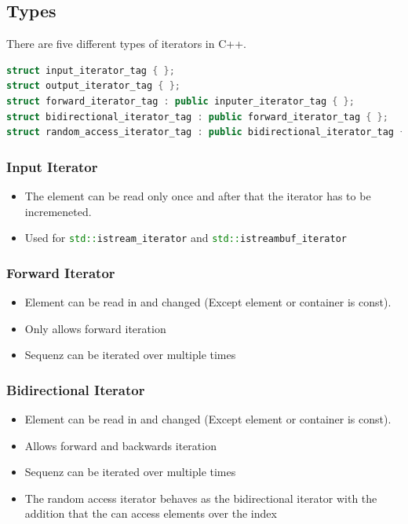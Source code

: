 \subsection{Types}
There are five different types of iterators in C++.
\begin{lstlisting}[language=C++]
struct input_iterator_tag { };
struct output_iterator_tag { };
struct forward_iterator_tag : public inputer_iterator_tag { };
struct bidirectional_iterator_tag : public forward_iterator_tag { };
struct random_access_iterator_tag : public bidirectional_iterator_tag { };
\end{lstlisting}

\subsubsection{Input Iterator}
\begin{itemize}
  \itemsep -0.5em 
  \item The element can be read only once and after that the iterator has to be incremeneted.
  \item Used for \lstinline[language=C++]|std::istream_iterator| and \lstinline[language=C++]|std::istreambuf_iterator|
\end{itemize}

\subsubsection{Forward Iterator}
\begin{itemize}
  \itemsep -0.5em 
  \item Element can be read in and changed (Except element or container is const).
  \item Only allows forward iteration
  \item Sequenz can be iterated over multiple times
\end{itemize}

\subsubsection{Bidirectional Iterator}
\begin{itemize}
  \itemsep -0.5em 
  \item Element can be read in and changed (Except element or container is const).
  \item Allows forward and backwards iteration
  \item Sequenz can be iterated over multiple times
  \item The random access iterator behaves as the bidirectional iterator with the addition that the can access elements over the index
\end{itemize}

